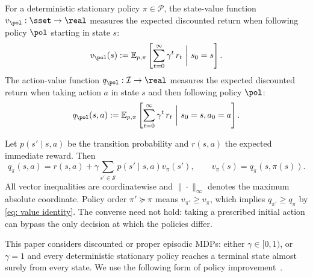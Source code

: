 For a deterministic stationary policy $\pi\in\mathcal P$,
the state-value function $v_\pol : \sset \to \real$ 
measures the expected discounted return when following policy $\pol$ starting in state $s$:
\begin{align*} 
    v_\pol(s)
    :=



    \mathbb E_{p, \pi} \left[ \sum_{t=0}^{\infty} \gamma^t \, r_t  \ \bigg| \ s_0 = s \right] .
\end{align*}
The action-value function $q_\pol : \mathcal I \to \real$ measures the expected discounted return when taking action $a$ in state $s$ and then following policy $\pol$:
\begin{align*} 
    q_\pol(s,a)
    :=



    \mathbb E_{p, \pi} \left[ \sum_{t=0}^{\infty} \gamma^t \, r_t  \ \bigg| \ s_0 = s, a_0 = a \right] .
\end{align*}

Let $p(s'\mid s,a)$ be the transition probability and $r(s,a)$ the expected immediate reward. Then
\begin{equation}\label{eq: value identity}
q_\pi(s,a)=r(s,a)+\gamma\sum_{s'\in\mathcal S}p(s'\mid s,a)v_\pi(s'),
\qquad v_\pi(s)=q_\pi(s,\pi(s)).
\end{equation}
All vector inequalities are coordinatewise and $\|\cdot\|_\infty$ denotes the maximum absolute coordinate. Policy order $\pi'\succeq\pi$ means $v_{\pi'}\ge v_\pi$, which implies $q_{\pi'}\ge q_\pi$ by \eqref{eq: value identity}. The converse need not hold: taking a prescribed initial action can bypass the only decision at which the policies differ.

This paper considers discounted or proper episodic MDPs: either $\gamma\in[0,1)$, or $\gamma=1$ and every deterministic stationary policy reaches a terminal state almost surely from every state. We use the following form of policy improvement~\citep{Howard1960DynamicProcesses}.

